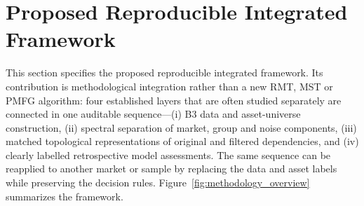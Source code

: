 \section{Proposed Reproducible Integrated Framework}
\label{sec:methodology}

This section specifies the proposed reproducible integrated framework. Its contribution is methodological integration rather than a new RMT, MST or PMFG algorithm: four established layers that are often studied separately are connected in one auditable sequence---(i) B3 data and asset-universe construction, (ii) spectral separation of market, group and noise components, (iii) matched topological representations of original and filtered dependencies, and (iv) clearly labelled retrospective model assessments. The same sequence can be reapplied to another market or sample by replacing the data and asset labels while preserving the decision rules. Figure~\ref{fig:methodology_overview} summarizes the framework.

